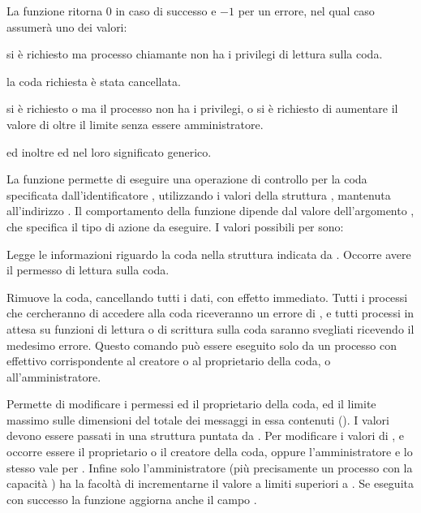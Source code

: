 \begin{funcproto}{
}

{La funzione ritorna $0$ in caso di successo e $-1$ per un errore, nel qual
  caso  assumerà uno dei valori: 
  \begin{errlist}
  \item[\errcode{EACCES}] si è richiesto  ma processo
    chiamante non ha i privilegi di lettura sulla coda.
  \item[\errcode{EIDRM}] la coda richiesta è stata cancellata.
  \item[\errcode{EPERM}] si è richiesto  o  ma
    il processo non ha i privilegi, o si è richiesto di aumentare il valore di
     oltre il limite  senza essere
    amministratore.
  \end{errlist}
  ed inoltre  ed  nel loro significato
  generico.}
\end{funcproto}

La funzione permette di eseguire una operazione di controllo per la coda
specificata dall'identificatore , utilizzando i valori della
struttura , mantenuta all'indirizzo . Il
comportamento della funzione dipende dal valore dell'argomento ,
che specifica il tipo di azione da eseguire. I valori possibili
per  sono:
\begin{basedescript}{\desclabelwidth{1.6cm}\desclabelstyle{\nextlinelabel}}
\item[\constd{IPC\_STAT}] Legge le informazioni riguardo la coda nella
  struttura  indicata da . Occorre avere il
  permesso di lettura sulla coda.
\item[\constd{IPC\_RMID}] Rimuove la coda, cancellando tutti i dati, con
  effetto immediato. Tutti i processi che cercheranno di accedere alla coda
  riceveranno un errore di , e tutti processi in attesa su
  funzioni di lettura o di scrittura sulla coda saranno svegliati ricevendo
  il medesimo errore. Questo comando può essere eseguito solo da un processo
  con  effettivo corrispondente al creatore o al proprietario della
  coda, o all'amministratore.
\item[\constd{IPC\_SET}] Permette di modificare i permessi ed il proprietario
  della coda, ed il limite massimo sulle dimensioni del totale dei messaggi in
  essa contenuti (). I valori devono essere passati in una
  struttura  puntata da .  Per modificare i
  valori di ,  e 
  occorre essere il proprietario o il creatore della coda, oppure
  l'amministratore e lo stesso vale per . Infine solo
  l'amministratore (più precisamente un processo con la capacità
  ) ha la facoltà di incrementarne il valore a
  limiti superiori a . Se eseguita con successo la funzione
  aggiorna anche il campo .
\end{basedescript}

